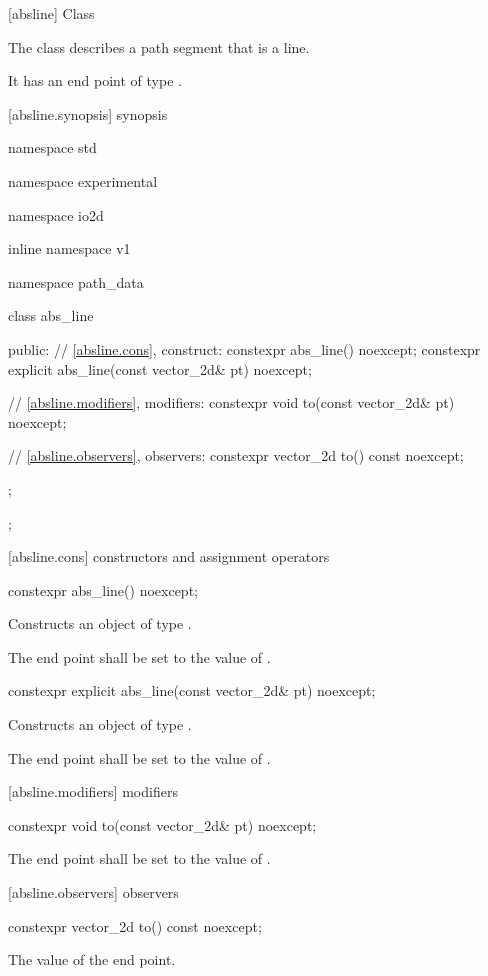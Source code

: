  [absline] {Class }

\pnum
{}
The class  describes a path segment that is a line.

\pnum
It has an end point of type .

 [absline.synopsis] { synopsis}

\begin{codeblock}
namespace std { namespace experimental { namespace io2d { inline namespace v1 {
  namespace path_data {
    class abs_line {
    public:
      // \ref{absline.cons}, construct:
      constexpr abs_line() noexcept;
      constexpr explicit abs_line(const vector_2d& pt) noexcept;

      // \ref{absline.modifiers}, modifiers:
      constexpr void to(const vector_2d& pt) noexcept;

      // \ref{absline.observers}, observers:
      constexpr vector_2d to() const noexcept;
    };
  };
} } } }
\end{codeblock}

 [absline.cons] { constructors and assignment operators}

\begin{itemdecl}
constexpr abs_line() noexcept;
\end{itemdecl}
\begin{itemdescr}
\pnum
\effects
Constructs an object of type .

\pnum
The end point shall be set to the value of .
\end{itemdescr}

\begin{itemdecl}
constexpr explicit abs_line(const vector_2d& pt) noexcept;
\end{itemdecl}
\begin{itemdescr}
\pnum
\effects
Constructs an object of type .

\pnum
The end point shall be set to the value of .
\end{itemdescr}

 [absline.modifiers]{ modifiers}

\begin{itemdecl}
constexpr void to(const vector_2d& pt) noexcept;
\end{itemdecl}
\begin{itemdescr}
\pnum
\effects
The end point shall be set to the value of .
\end{itemdescr}

 [absline.observers]{ observers}

\begin{itemdecl}
constexpr vector_2d to() const noexcept;
\end{itemdecl}
\begin{itemdescr}
\pnum
\returns
The value of the end point.
\end{itemdescr}
